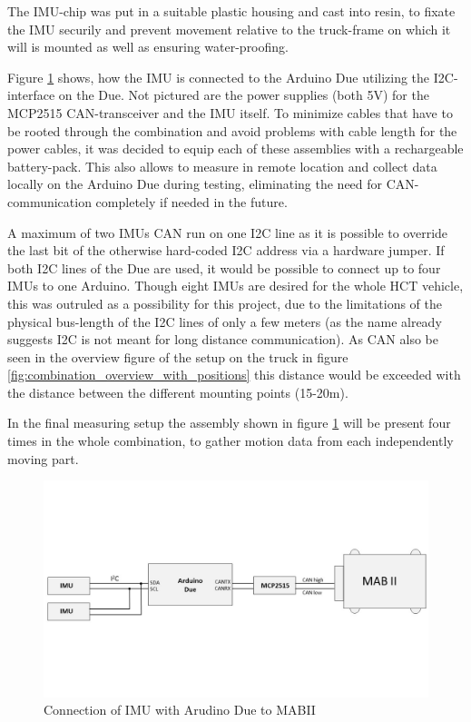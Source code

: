 \documentclass[ExampleMasters.tex]{subfiles}
\begin{document}
The \gls{IMU}-chip was put in a suitable plastic housing and cast into resin, to fixate the \gls{IMU} securily and prevent movement relative to the truck-frame on which it will is mounted as well as ensuring water-proofing.

Figure \ref{fig:IMU_overview} shows, how the \gls{IMU} is connected to the Arduino Due utilizing the \gls{I2C}-interface on the Due. Not pictured are the power supplies (both 5V) for the MCP2515 \gls{CAN}-transceiver and the \gls{IMU} itself. To minimize cables that have to be rooted through the combination and avoid problems with cable length for the power cables, it was decided to equip each of these assemblies with a rechargeable battery-pack. This also allows to measure in remote location and collect data locally on the Arduino Due during testing, eliminating the need for CAN-communication completely if needed in the future.

A maximum of two \gls{IMU}s \gls{CAN} run on one \gls{I2C} line as it is possible to override the last bit of the otherwise hard-coded \gls{I2C} address via a hardware jumper. If both \gls{I2C} lines of the Due are used, it would be possible to connect up to four IMUs to one Arduino. Though eight \gls{IMU}s are desired for the whole \gls{HCT} vehicle, this was outruled as a possibility for this project, due to the limitations of the physical bus-length of the \gls{I2C} lines of only a few meters (as the name already suggests \gls{I2C} is not meant for long distance communication). As \gls{CAN} also be seen in the overview figure of the setup on the truck in figure \ref{fig:combination_overview_with_positions} this distance would be exceeded with the distance between the different mounting points (15-20m).

In the final measuring setup the assembly shown in figure \ref{fig:IMU_overview} will be present four times in the whole combination, to gather motion data from each independently moving part. 

\begin{figure}[!htb]
	\centering
	\includegraphics[width=1\linewidth]{figures/IMU_overview}
	\caption{Connection of \gls{IMU} with Arudino Due to \gls{MABII}}
	\label{fig:IMU_overview}
\end{figure}
\end{document}
